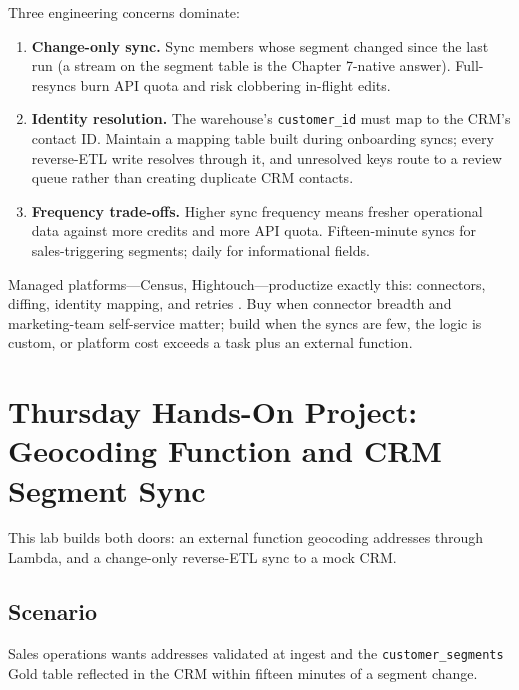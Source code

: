 Three engineering concerns dominate:
\begin{enumerate}
    \item \textbf{Change-only sync.} Sync members whose segment changed since the last run (a stream on the segment table is the Chapter 7-native answer). Full-resyncs burn API quota and risk clobbering in-flight edits.
    \item \textbf{Identity resolution.} The warehouse's \texttt{customer\_id} must map to the CRM's contact ID. Maintain a mapping table built during onboarding syncs; every reverse-ETL write resolves through it, and unresolved keys route to a review queue rather than creating duplicate CRM contacts.
    \item \textbf{Frequency trade-offs.} Higher sync frequency means fresher operational data against more credits and more API quota. Fifteen-minute syncs for sales-triggering segments; daily for informational fields.
\end{enumerate}

\begin{notebox}
Managed platforms---Census, Hightouch---productize exactly this: connectors, diffing, identity mapping, and retries \cite{censusDocs}. Buy when connector breadth and marketing-team self-service matter; build when the syncs are few, the logic is custom, or platform cost exceeds a task plus an external function.
\end{notebox}

\section{Thursday Hands-On Project: Geocoding Function and CRM Segment Sync}
This lab builds both doors: an external function geocoding addresses through Lambda, and a change-only reverse-ETL sync to a mock CRM.

\subsection*{Scenario}
Sales operations wants addresses validated at ingest and the \texttt{customer\_segments} Gold table reflected in the CRM within fifteen minutes of a segment change.


